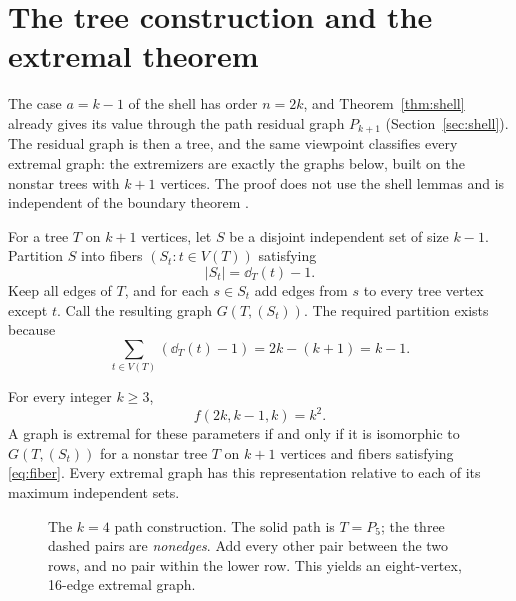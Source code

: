\section{The tree construction and the extremal theorem}\label{sec:strip}

The case $a=k-1$ of the shell has order $n=2k$, and Theorem~\ref{thm:shell} already gives its value through the path residual graph $P_{k+1}$ (Section~\ref{sec:shell}).
The residual graph is then a tree, and the same viewpoint classifies every extremal graph: the extremizers are exactly the graphs below, built on the nonstar trees with $k+1$ vertices.
The proof does not use the shell lemmas and is independent of the boundary theorem \cite{DG}.


For a tree $T$ on $k+1$ vertices, let $S$ be a disjoint independent set of size $k-1$.
Partition $S$ into fibers $(S_t:t\in V(T))$ satisfying
\begin{equation}\label{eq:fiber}
|S_t|=\dd_T(t)-1.
\end{equation}
Keep all edges of $T$, and for each $s\in S_t$ add edges from $s$ to every tree vertex except $t$.
Call the resulting graph $G(T,(S_t))$.
The required partition exists because
\begin{equation}\label{eq:sum}
\sum_{t\in V(T)}(\dd_T(t)-1)=2k-(k+1)=k-1.
\end{equation}

\begin{theorem}\label{thm:main}
For every integer $k\ge3$,
\begin{equation}
f(2k,k-1,k)=k^2.
\end{equation}
A graph is extremal for these parameters if and only if it is isomorphic to $G(T,(S_t))$ for a nonstar tree $T$ on $k+1$ vertices and fibers satisfying \eqref{eq:fiber}.
Every extremal graph has this representation relative to each of its maximum independent sets.
\end{theorem}

\begin{figure}[ht]
\centering
{}
\caption{The $k=4$ path construction. The solid path is $T=P_5$; the three dashed pairs are \emph{nonedges}. Add every other pair between the two rows, and no pair within the lower row. This yields an eight-vertex, 16-edge extremal graph.}
\label{fig:path}
\end{figure}

